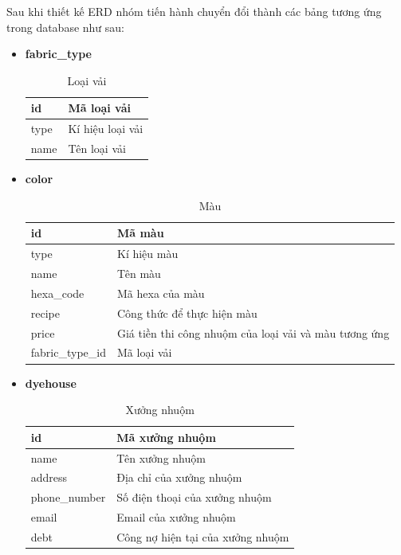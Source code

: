 \newpage
Sau khi thiết kế ERD nhóm tiến hành chuyển đổi thành các bảng tương ứng trong database như sau:
\begin{itemize}
    \item \textbf{fabric\_type}
    \begin{table}[H]
        \centering
        \begin{tabular}{|m{3cm}|m{10cm}|}
        \hline 
            id & Mã loại vải\\ \hline
            type & Kí hiệu loại vải \\ \hline
            name & Tên loại vải\\
        \hline 
        \end{tabular}
        \caption{Loại vải}
        \label{fabric_type}
    \end{table}
    
    \item \textbf{color}
    \begin{table}[H]
        \centering
        \begin{tabular}{|m{3cm}|m{10cm}|}
        \hline 
            id & Mã màu\\ \hline
            type & Kí hiệu màu \\ \hline
            name & Tên màu\\ \hline
            hexa\_code & Mã hexa của màu \\ \hline
            recipe & Công thức để thực hiện màu \\ \hline
            price & Giá tiền thi công nhuộm của loại vải và màu tương ứng \\ \hline
            fabric\_type\_id & Mã loại vải \\ 
        \hline 
        \end{tabular}
        \caption{Màu}
        \label{color}
    \end{table}
    
    \item \textbf{dyehouse}
    \begin{table}[H]
        \centering
        \begin{tabular}{|m{3cm}|m{10cm}|}
        \hline 
            id & Mã xưởng nhuộm\\ \hline
            name & Tên xưởng nhuộm \\ \hline
            address & Địa chỉ của xưởng nhuộm\\ \hline
            phone\_number & Số điện thoại của xưởng nhuộm \\ \hline
            email & Email của xưởng nhuộm\\ \hline
            debt & Công nợ hiện tại của xưởng nhuộm\\
        \hline 
        \end{tabular}
        \caption{Xưởng nhuộm}
        \label{dyehouse}
    \end{table}
    

\end{itemize}
